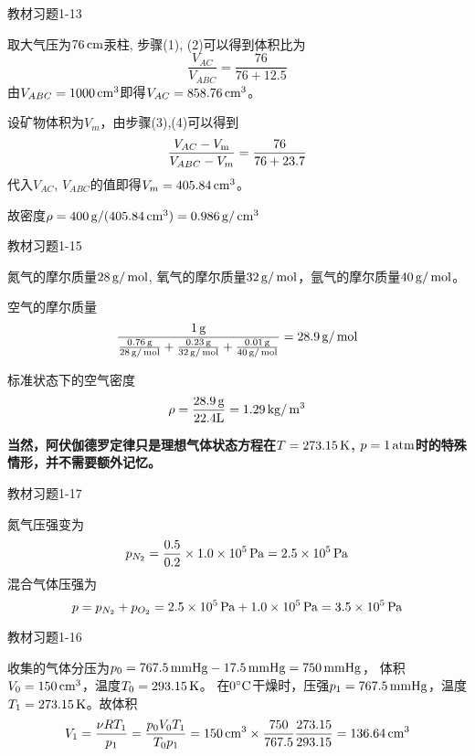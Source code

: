 \documentclass[CJK]{beamer}
\begin{document}
\begin{frame}
\bch
{\blue 教材习题1-13}

\skipline

{\scriptsize
取大气压为$76\,\mathrm{cm}$汞柱, 步骤(1), (2)可以得到体积比为
$$\frac{V_{AC}}{V_{ABC}} = \frac{76}{76+12.5}$$
由$V_{ABC} = 1000\,\mathrm{cm}^3$即得$V_{AC} = 858.76 \,\mathrm{cm}^3$。

设矿物体积为$V_m$，由步骤(3),(4)可以得到
$$\frac{V_{AC}-V_{\rm m}}{V_{ABC}-V_m} = \frac{76}{76+23.7}$$
代入$V_{AC}$, $V_{ABC}$的值即得$V_m = 405.84\,\mathrm{cm}^3$。

故密度$\rho = 400\,\mathrm{g}/(405.84\,\mathrm{cm}^3) = 0.986 \,\mathrm{g}/\,\mathrm{cm}^3$
}
\ech
\end{frame}

\begin{frame}
\bch
{\blue 教材习题1-15}

\skipline

{\scriptsize
氮气的摩尔质量$28\,\mathrm{g}/\,\mathrm{mol}$, 氧气的摩尔质量$32\,\mathrm{g}/\,\mathrm{mol}$，氩气的摩尔质量$40\,\mathrm{g}/\,\mathrm{mol}$。

空气的摩尔质量
$$\frac{1\,\mathrm{g}}{\frac{0.76\,\mathrm{g}}{28\,\mathrm{g}/\,\mathrm{mol}}+\frac{0.23\,\mathrm{g}}{32\,\mathrm{g}/\,\mathrm{mol}}+\frac{0.01\,\mathrm{g}}{40\,\mathrm{g}/\,\mathrm{mol}}} = 28.9\,\mathrm{g}/\,\mathrm{mol} $$

标准状态下的空气密度
$$\rho = \frac{28.9\,\mathrm{g}}{22.4\mathrm{L}} = 1.29\,\mathrm{kg}/\,\mathrm{m}^3$$

{\bf 当然，阿伏伽德罗定律只是理想气体状态方程在$T=273.15\,\mathrm{K}$, $p = 1\,\mathrm{atm}$时的特殊情形，并不需要额外记忆。}
}
\ech
\end{frame}




\begin{frame}
\bch
{\blue 教材习题1-17}

\skipline

{\small
氮气压强变为
$$p_{N_2} = \frac{0.5}{0.2}\times 1.0\times 10^5\,\mathrm{Pa} = 2.5\times 10^5\,\mathrm{Pa}$$
混合气体压强为
$$p = p_{N_2} + p_{O_2} = 2.5\times 10^5 \,\mathrm{Pa} + 1.0\times 10^5\,\mathrm{Pa} = 3.5\times 10^5 \,\mathrm{Pa}$$
}
\ech
\end{frame}

\begin{frame}
\bch
{\blue 教材习题1-16}

\skipline

{\small
收集的气体分压为$p_0=767.5\,\mathrm{mmHg} - 17.5\,\mathrm{mmHg} = 750\,\mathrm{mmHg}$， 体积$V_0=150\,\mathrm{cm}^3$，温度$T_0=293.15\,\mathrm{K}$。
在$0^\circ \mathrm{C}$干燥时，压强$p_1 = 767.5\,\mathrm{mmHg}$，温度$T_1 = 273.15\,\mathrm{K}$。故体积
$$V_1 = \frac{\nu R T_1}{p_1} = \frac{p_0V_0 T_1}{T_0 p_1} = 150\,\mathrm{cm}^3 \times \frac{750}{767.5}\frac{273.15}{293.15} = 136.64 \,\mathrm{cm}^3 $$
}
\ech
\end{frame}
\end{document}
